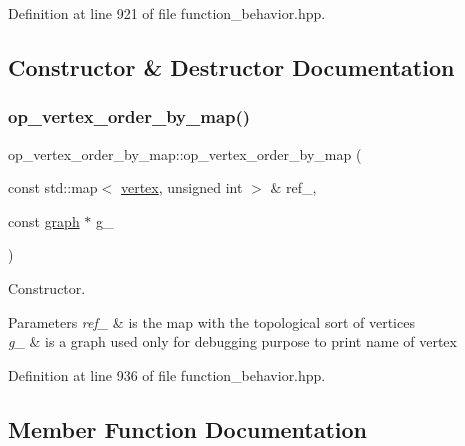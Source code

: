 Definition at line 921 of file function\+\_\+behavior.\+hpp.



\subsection{Constructor \& Destructor Documentation}
\mbox{\label{classop__vertex__order__by__map_addb180a98b65dafe68efb76ca14f0de0}} 
\subsubsection{\texorpdfstring{op\+\_\+vertex\+\_\+order\+\_\+by\+\_\+map()}{op\_vertex\_order\_by\_map()}}
{\footnotesize\ttfamily op\+\_\+vertex\+\_\+order\+\_\+by\+\_\+map\+::op\+\_\+vertex\+\_\+order\+\_\+by\+\_\+map (\begin{DoxyParamCaption}\item[{const std\+::map$<$ \hyperlink{graph_8hpp_abefdcf0544e601805af44eca032cca14}{vertex}, unsigned int $>$ \&}]{ref\+\_\+,  }\item[{const \hyperlink{structgraph}{graph} $\ast$}]{g\+\_\+ }\end{DoxyParamCaption})\hspace{0.3cm}{\ttfamily [inline]}}



Constructor. 


\begin{DoxyParams}{Parameters}
{\em ref\+\_\+} & is the map with the topological sort of vertices \\
\hline
{\em g\+\_\+} & is a graph used only for debugging purpose to print name of vertex \\
\hline
\end{DoxyParams}


Definition at line 936 of file function\+\_\+behavior.\+hpp.



\subsection{Member Function Documentation}
\mbox{\label{classop__vertex__order__by__map_a8147b8c9bd83ccb15e82507a650eaba1}} 
